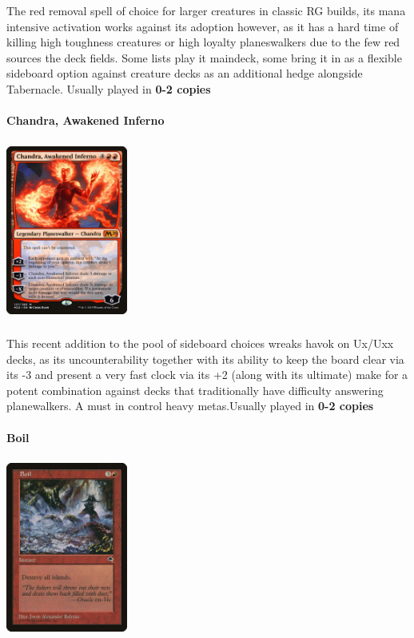\documentclass{report}
\begin{document}
The red removal spell of choice for larger creatures in classic RG builds, its mana intensive activation works against its adoption however, as it has a hard time of killing high toughness creatures or high loyalty planeswalkers due to the few red sources the deck fields. Some lists play it maindeck, some bring it in as a flexible sideboard option against creature decks as an additional hedge alongside Tabernacle. Usually played in \textbf{0-2 copies}\\\\
\textbf{Chandra, Awakened Inferno\\}
\begin{center}
\includegraphics [width = 4cm, height = 6cm] {chandra-awakened-inferno}
\end{center}
This recent addition to the pool of sideboard choices wreaks havok on Ux/Uxx decks, as its uncounterability together with its ability to keep the board clear via its -3 and present a very fast clock via its +2 (along with its ultimate) make for a potent combination against decks that traditionally have difficulty answering planewalkers. A must in control heavy metas.Usually played in \textbf{0-2 copies}\\\\
\newpage
\textbf{Boil\\}
\begin{center}
\includegraphics [width = 4cm, height = 6cm] {boil}
\end{center}
\end{document}

